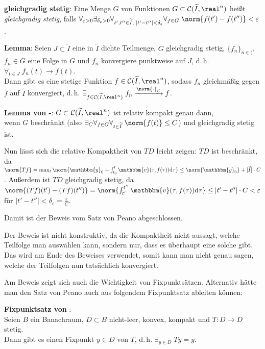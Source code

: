 \textbf{gleichgradig stetig}:
Eine Menge $G$ von Funktionen $G \subset \C(\widetilde{I}, \real^n)$ heißt
\emph{gleichgradig stetig}, falls
$\forall_{\varepsilon > 0} \exists_{\delta_\varepsilon > 0}
\forall_{t', t'' \in \widetilde{I},\; |t' - t''| < \delta_\varepsilon}
\forall_{f \in G}\; \norm{f(t') - f(t'')} < \varepsilon$.

\textbf{Lemma}:
Seien $J \subset \widetilde{I}$ eine in $\widetilde{I}$ dichte Teilmenge,
$G$ gleichgradig stetig,
$\{f_n\}_{n \in \natural}$, $f_n \in G$ eine Folge in $G$ und
$f_n$ konvergiere punktweise auf $J$, d.\,h.
$\forall_{t \in J}\; f_n(t) \to f(t)$. \\
Dann gibt es eine stetige Funktion $f \in \C(\widetilde{I}, \real^n)$, sodass
$f_n$ gleichmäßig gegen $f$ auf $\widetilde{I}$ konvergiert, d.\,h.
$\exists_{f \in \C(\widetilde{I}, \real^n)}\;
f_n \xrightarrow{\norm{\cdot}_\C} f$.

\textbf{Lemma von -}:
$G \subset \C(\widetilde{I}, \real^n)$ ist relativ kompakt genau dann, \\
wenn $G$ beschränkt (also $\exists_{C} \forall_{f \in G}
\forall_{t \in \widetilde{I}}\; \norm{f(t)} \le C$) und
gleichgradig stetig ist.

Nun lässt sich die relative Kompaktheit von $TD$ leicht zeigen:
$TD$ ist beschränkt, da \\
$\norm{Tf} = \max_t
\norm{\mathbbm{y}_0 + \int_{t_0}^t \mathbbm{v}(\tau, f(\tau))\d\tau} \le
\norm{\mathbbm{y}_0} + |\widetilde{I}| \cdot C$.
Außerdem ist $TD$ gleichgradig stetig, da
$\norm{(Tf)(t') - (Tf)(t'')} =
\norm{\int_{t'}^{t''} \mathbbm{v}(\tau, f(\tau))\d\tau} \le
|t' - t''| \cdot C < \varepsilon$ für
$|t' - t''| < \delta_\varepsilon = \frac{\varepsilon}{C}$.

Damit ist der Beweis vom Satz von Peano abgeschlossen.

\linie
\pagebreak

Der Beweis ist nicht konstruktiv, da die Kompaktheit nicht aussagt, welche
Teilfolge man auswählen kann, sondern nur, dass es überhaupt eine solche gibt.
Das wird am Ende des Beweises verwendet, somit kann man nicht genau sagen,
welche der Teilfolgen nun tatsächlich konvergiert.

Am Beweis zeigt sich auch die Wichtigkeit von Fixpunktsätzen.
Alternativ hätte man den Satz von Peano auch aus folgendem Fixpunktsatz
ableiten können:

\textbf{Fixpunktsatz von }: \\
Seien $B$ ein Banachraum, $D \subset B$ nicht-leer, konvex, kompakt und
$T\colon D \rightarrow D$ stetig. \\
Dann gibt es einen Fixpunkt $y \in D$ von $T$, d.\,h.
$\exists_{y \in D}\; Ty = y$.

